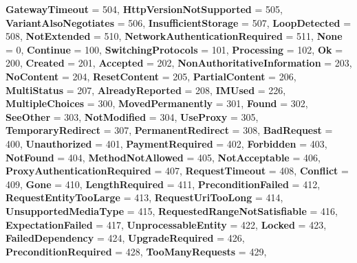 \begin{DoxyCompactItemize}
{\bfseries Gateway\+Timeout} = 504, 
\newline
{\bfseries Http\+Version\+Not\+Supported} = 505, 
{\bfseries Variant\+Also\+Negotiates} = 506, 
{\bfseries Insufficient\+Storage} = 507, 
{\bfseries Loop\+Detected} = 508, 
\newline
{\bfseries Not\+Extended} = 510, 
{\bfseries Network\+Authentication\+Required} = 511, 
{\bfseries None} = 0, 
{\bfseries Continue} = 100, 
\newline
{\bfseries Switching\+Protocols} = 101, 
{\bfseries Processing} = 102, 
{\bfseries Ok} = 200, 
{\bfseries Created} = 201, 
\newline
{\bfseries Accepted} = 202, 
{\bfseries Non\+Authoritative\+Information} = 203, 
{\bfseries No\+Content} = 204, 
{\bfseries Reset\+Content} = 205, 
\newline
{\bfseries Partial\+Content} = 206, 
{\bfseries Multi\+Status} = 207, 
{\bfseries Already\+Reported} = 208, 
{\bfseries I\+M\+Used} = 226, 
\newline
{\bfseries Multiple\+Choices} = 300, 
{\bfseries Moved\+Permanently} = 301, 
{\bfseries Found} = 302, 
{\bfseries See\+Other} = 303, 
\newline
{\bfseries Not\+Modified} = 304, 
{\bfseries Use\+Proxy} = 305, 
{\bfseries Temporary\+Redirect} = 307, 
{\bfseries Permanent\+Redirect} = 308, 
\newline
{\bfseries Bad\+Request} = 400, 
{\bfseries Unauthorized} = 401, 
{\bfseries Payment\+Required} = 402, 
{\bfseries Forbidden} = 403, 
\newline
{\bfseries Not\+Found} = 404, 
{\bfseries Method\+Not\+Allowed} = 405, 
{\bfseries Not\+Acceptable} = 406, 
{\bfseries Proxy\+Authentication\+Required} = 407, 
\newline
{\bfseries Request\+Timeout} = 408, 
{\bfseries Conflict} = 409, 
{\bfseries Gone} = 410, 
{\bfseries Length\+Required} = 411, 
\newline
{\bfseries Precondition\+Failed} = 412, 
{\bfseries Request\+Entity\+Too\+Large} = 413, 
{\bfseries Request\+Uri\+Too\+Long} = 414, 
{\bfseries Unsupported\+Media\+Type} = 415, 
\newline
{\bfseries Requested\+Range\+Not\+Satisfiable} = 416, 
{\bfseries Expectation\+Failed} = 417, 
{\bfseries Unprocessable\+Entity} = 422, 
{\bfseries Locked} = 423, 
\newline
{\bfseries Failed\+Dependency} = 424, 
{\bfseries Upgrade\+Required} = 426, 
{\bfseries Precondition\+Required} = 428, 
{\bfseries Too\+Many\+Requests} = 429, 

\end{DoxyCompactItemize}
